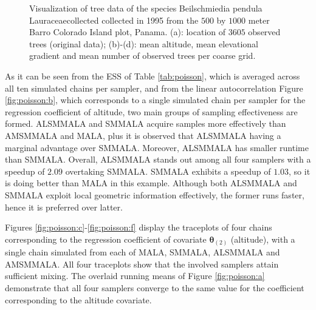 \documentclass[twoside,11pt]{article}
\begin{document}
\begin{figure}
	\caption{Visualization of tree data of the species Beilschmiedia pendula Lauraceaecollected collected in 1995 from the 
	$500$ by $1000$ meter Barro Colorado Island plot, Panama. (a): location of $3605$ observed trees (original data); (b)-(d): 
	mean altitude, mean elevational gradient and mean number of observed trees per coarse grid.}
	\label{fig:poisson_data}
\end{figure}

As it can be seen from the ESS of Table \ref{tab:poisson}, which is averaged across all ten simulated chains per sampler, 
and from the linear autocorrelation Figure \ref{fig:poisson:b}, which corresponds to a single simulated chain per sampler 
for the regression coefficient of altitude, two main groups of sampling effectiveness are formed. ALSMMALA and SMMALA 
acquire samples more effectively than AMSMMALA and MALA, plus it is observed that ALSMMALA having a marginal advantage over 
SMMALA. Moreover, ALSMMALA has smaller runtime than SMMALA. Overall, ALSMMALA stands out among all four samplers with a 
speedup of $2.09$ overtaking SMMALA. SMMALA exhibits a speedup of $1.03$, so it is doing better than MALA in this example. 
Although both ALSMMALA and SMMALA exploit local geometric information effectively, the former runs faster, hence it is 
preferred over latter. 

Figures \ref{fig:poisson:c}-\ref{fig:poisson:f} display the traceplots of four chains corresponding to the regression 
coefficient of covariate $\boldsymbol{\theta}_{(2)}$ (altitude), with a single chain simulated from each of MALA, SMMALA,
ALSMMALA and AMSMMALA. All four traceplots show that the involved samplers attain sufficient mixing. The overlaid running 
means of Figure \ref{fig:poisson:a} demonstrate that all four samplers converge to the same value for the coefficient 
corresponding to the altitude covariate.
\end{document}

